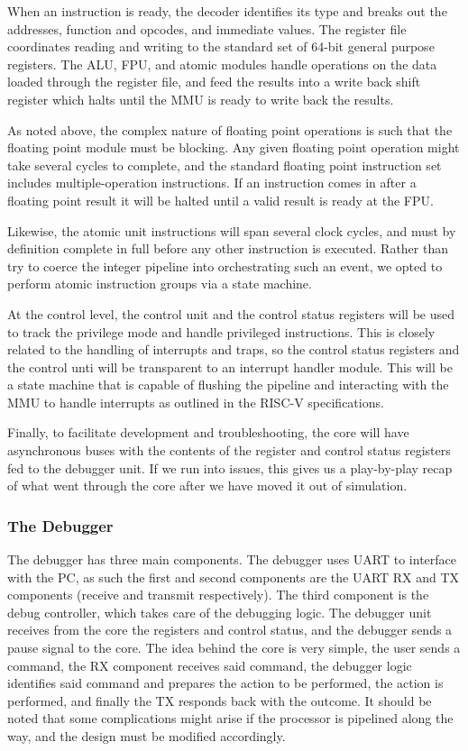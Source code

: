 \documentclass{article}
\begin{document}
    When an instruction is ready, the decoder identifies its type and breaks out the addresses, function and opcodes, and immediate values.  The register file coordinates reading and writing to the standard set of 64-bit general purpose registers.  The ALU, FPU, and atomic modules handle operations on the data loaded through the register file, and feed the results into a write back shift register which halts until the MMU is ready to write back the results.
    
    As noted above, the complex nature of floating point operations is such that the floating point module must be blocking. Any given floating point operation might take several cycles to complete, and the standard floating point instruction set includes multiple-operation instructions. If an instruction comes in after a floating point result it will be halted until a valid result is ready at the FPU.
    
    Likewise, the atomic unit instructions will span several clock cycles, and must by definition complete in full before any other instruction is executed.  Rather than try to coerce the integer pipeline into orchestrating such an event, we opted to perform atomic instruction groups via a state machine.
    
    At the control level, the control unit and the control status registers will be used to track the privilege mode and handle privileged instructions.  This is closely related to the handling of interrupts and traps, so the control status registers and the control unti will be transparent to an interrupt handler module.  This will be a state machine that is capable of flushing the pipeline and interacting with the MMU to handle interrupts as outlined in the RISC-V specifications.
    
    Finally, to facilitate development and troubleshooting, the core will have asynchronous buses with the contents of the register and control status registers fed to the debugger unit.  If we run into issues, this gives us a play-by-play recap of what went through the core after we have moved it out of simulation.
    
    \subsubsection{The Debugger}
    The debugger has three main components.  The debugger uses UART to interface with the PC, as such the first and second components are the UART RX and TX components (receive and transmit respectively). The third component is the debug controller, which takes care of the debugging logic. The debugger unit receives from the core the registers and control status, and the debugger sends a pause signal to the core. The idea behind the core is very simple, the user sends a command, the RX component receives said command, the debugger logic identifies said command and prepares the action to be performed, the action is performed, and finally the TX responds back with the outcome.
    It should be noted that some complications might arise if the processor is pipelined along the way, and the design must be modified   accordingly.
    
\end{document}
